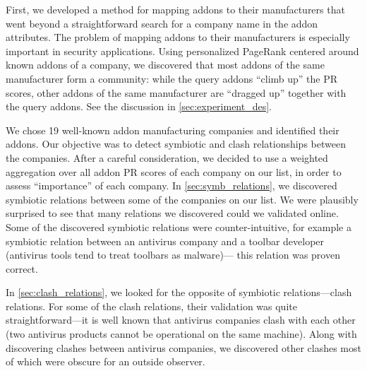 \documentclass[11pt,oneside]{book}
\begin{document}
First, we developed a method for mapping addons to their manufacturers that went beyond a straightforward search for a company name in the addon attributes. The problem of mapping addons to their manufacturers is especially important in security applications. Using personalized PageRank centered around known addons of a company, we discovered that most addons of the same manufacturer form a community: while the query addons ``climb up'' the PR scores, other addons of the same manufacturer are ``dragged up'' together with the query addons. See the discussion in \autoref{sec:experiment_des}.

We chose 19 well-known addon manufacturing companies and identified their addons. Our objective was to detect symbiotic and clash relationships between the companies. 
After a careful consideration, we decided to use a weighted aggregation over all addon PR scores of each company on our list, in order to assess ``importance'' of each company.
In \autoref{sec:symb_relations}, we discovered symbiotic relations between some of the companies on our list. We were plausibly surprised to see that many relations we discovered could we validated online. Some of the discovered symbiotic relations were counter-intuitive, for example a symbiotic relation between an antivirus company and a toolbar developer (antivirus tools tend to treat toolbars as malware)--- this relation was proven correct.

In \autoref{sec:clash_relations}, we looked for the opposite of symbiotic relations---clash relations. For some of the clash relations, their validation was quite straightforward---it is well known that antivirus companies clash with each other (two antivirus products cannot be operational on the same machine). Along with discovering clashes between antivirus companies, we discovered other clashes most of which were obscure for an outside observer.


\end{document}
